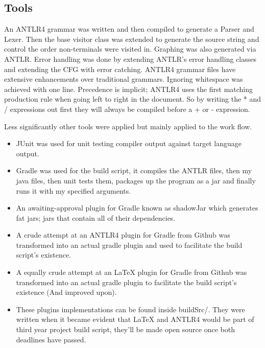 \documentclass[a4paper,12pt]{article}
\begin{document}
\subsection{Tools}
An ANTLR4 grammar was written and then compiled to generate a Parser and Lexer. Then the base visitor class was extended to generate the source string and control the order non-terminals were visited in. Graphing was also generated via ANTLR. Error handling was done by extending ANTLR's error handling classes and extending the \gls{CFG} with error catching. ANTLR4 grammar files have extensive enhancements over traditional grammars. Ignoring whitespace was achieved with one
line. Precedence is implicit; ANTLR4 uses the first matching production rule when going left to right in the document. So by writing the * and / expressions out first they will always be compiled before a + or - expression.

Less significantly other tools were applied but mainly applied to the work flow.
\begin{itemize}
    \item JUnit was used for unit testing compiler output against target language output.
    \item Gradle was used for the build script, it compiles the ANTLR files, then my java files, then unit tests them, packages up the program as a jar and finally runs it with my specified arguments.
    \item An awaiting-approval plugin for Gradle known as shadowJar which generates fat jars; jars that contain all of their dependencies.
    \item A crude attempt at an ANTLR4 plugin for Gradle from Github was transformed into an actual gradle plugin and used to facilitate the build script's existence.
    \item A equally crude attempt at an LaTeX plugin for Gradle from Github was transformed into an actual gradle plugin to facilitate the build script's existence (And improved upon).
    \item These plugins implementations can be found inside buildSrc/. They were written when it became evident that LaTeX and ANTLR4 would be part of third year project build script, they'll be made open source once both deadlines have passed.
\end{itemize}
\end{document}
